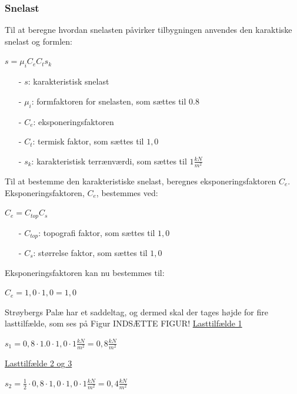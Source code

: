 \subsubsection{Snelast}
Til at beregne hvordan snelasten påvirker tilbygningen anvendes den karaktiske snelast og formlen:
\begin{center}
$s=\mu_iC_eC_ts_k$
\end{center}
\begin{itemize}
	\item[-] $s$: karakteristisk snelast
	\item[-] $\mu_i$: formfaktoren for snelasten, som sættes til 0.8 \citep[ tabel 5.2 kapitel 5.3]{EU91}
	\item[-] $C_e$: eksponeringsfaktoren
	\item[-] $C_t$: termisk faktor, som sættes til $1,\!0$ \citep[ kapitel 5.2]{EU91}
	\item[-] $s_k$: karakteristisk terrænværdi, som sættes til $1 \frac{kN}{m^2}$ \citep[ kapitel 4.1]{EU91}
\end{itemize}
Til at bestemme den karakteristiske snelast, beregnes eksponeringsfaktoren $C_e$.
\newline
\newline
Eksponeringsfaktoren, $C_e$, bestemmes ved:
\begin{center}
$C_e=C_{top}C_s$
\end{center}
\begin{itemize}
	\item[-] $C_{top}$: topografi faktor, som sættes til $1,\!0$ \citep[ tabel 5.1 kapitel 5.2]{EU91}
	\item[-] $C_s$: størrelse faktor, som sættes til $1,\!0$ \citep[ kapitel 5.2]{EU91}
\end{itemize}
Eksponeringsfaktoren kan nu bestemmes til:
\begin{center}
$C_e=1,\!0\cdot 1,\!0=1,\!0$
\end{center}
Strøybergs Palæ har et saddeltag, og dermed skal der tages højde for fire lasttilfælde, som ses på Figur INDSÆTTE FIGUR!
\newline
\newline
\underline{Lasttilfælde 1}
\begin{center}
$s_1=0,\!8\cdot 1.0\cdot 1,\!0\cdot 1 \frac{kN}{m^2}=0,\!8 \frac{kN}{m^2}$
\end{center}
\underline{Lasttilfælde 2 og 3}
\begin{center}
$s_2=\frac{1}{2}\cdot 0,\!8\cdot 1,\!0\cdot 1,\!0\cdot 1 \frac{kN}{m^2}=0,\!4 \frac{kN}{m^2}$
\end{center}
